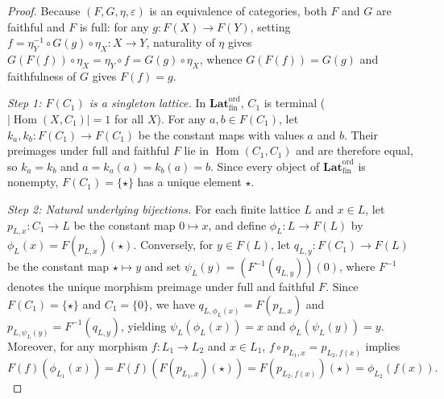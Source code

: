 \documentclass[11pt]{article}
\theoremstyle{definition}
\newcommand{\FinLatOrd}{\mathbf{Lat}_{\mathrm{fin}}^{\mathrm{ord}}}
\newcommand{\Hom}{\operatorname{Hom}}
\begin{document}
\begin{proof}
Because $(F, G, \eta, \varepsilon)$ is an equivalence of categories, both $F$ and
$G$ are faithful and $F$ is full: for any $g : F(X) \to F(Y)$, setting
$f = \eta_Y^{-1} \circ G(g) \circ \eta_X : X \to Y$, naturality of $\eta$ gives
$G(F(f)) \circ \eta_X = \eta_Y \circ f = G(g) \circ \eta_X$, whence
$G(F(f)) = G(g)$ and faithfulness of $G$ gives $F(f) = g$.

\emph{Step 1: $F(C_1)$ is a singleton lattice.} In $\FinLatOrd$, $C_1$ is
terminal ($|\Hom(X, C_1)| = 1$ for all $X$). For any $a, b \in F(C_1)$, let
$k_a, k_b : F(C_1) \to F(C_1)$ be the constant maps with values $a$ and $b$.
Their preimages under full and faithful $F$ lie in $\Hom(C_1, C_1)$ and are
therefore equal, so $k_a = k_b$ and $a = k_a(a) = k_b(a) = b$. Since every
object of $\FinLatOrd$ is nonempty, $F(C_1) = \{\star\}$ has a unique element
$\star$.

\emph{Step 2: Natural underlying bijections.} For each finite lattice $L$ and
$x \in L$, let $p_{L,x} : C_1 \to L$ be the constant map $0 \mapsto x$, and
define $\phi_L : L \to F(L)$ by $\phi_L(x) = F(p_{L,x})(\star)$. Conversely, for
$y \in F(L)$, let $q_{L,y} : F(C_1) \to F(L)$ be the constant map $\star \mapsto y$
and set $\psi_L(y) = (F^{-1}(q_{L,y}))(0)$, where $F^{-1}$ denotes the unique
morphism preimage under full and faithful $F$. Since $F(C_1) = \{\star\}$ and
$C_1 = \{0\}$, we have $q_{L,\phi_L(x)} = F(p_{L,x})$ and
$p_{L,\psi_L(y)} = F^{-1}(q_{L,y})$, yielding $\psi_L(\phi_L(x)) = x$ and
$\phi_L(\psi_L(y)) = y$. Moreover, for any morphism $f : L_1 \to L_2$ and
$x \in L_1$, $f \circ p_{L_1,x} = p_{L_2,f(x)}$ implies
\begin{equation}
\label{eq:phi-nat}
  F(f)(\phi_{L_1}(x)) = F(f)(F(p_{L_1,x})(\star)) = F(p_{L_2,f(x)})(\star) = \phi_{L_2}(f(x)).
\end{equation}


\end{proof}
\end{document}
